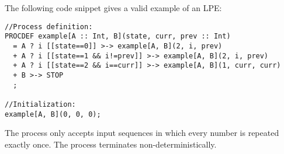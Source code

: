 The following code snippet gives a valid example of an LPE:

\begin{lstlisting}
//Process definition:
PROCDEF example[A :: Int, B](state, curr, prev :: Int)
  = A ? i [[state==0]] >-> example[A, B](2, i, prev)
  + A ? i [[state==1 && i!=prev]] >-> example[A, B](2, i, prev)
  + A ? i [[state==2 && i==curr]] >-> example[A, B](1, curr, curr)
  + B >-> STOP
  ;

//Initialization:
example[A, B](0, 0, 0);
\end{lstlisting}

The process only accepts input sequences in which every number is repeated exactly once.
The process terminates non-deterministically.
